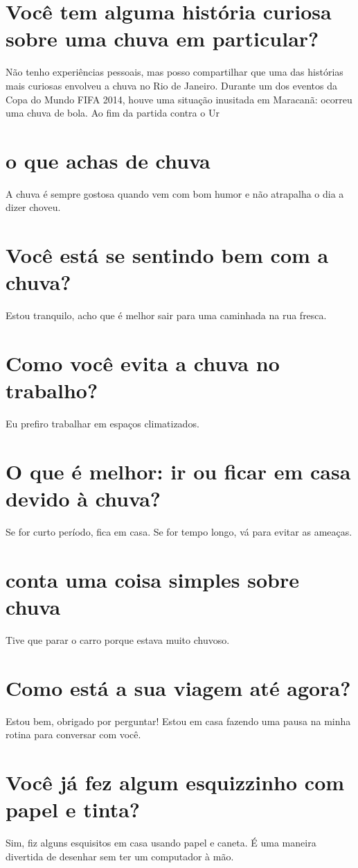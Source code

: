 \documentclass[11pt,a4paper]{article}
\begin{document}
\section{Você tem alguma história curiosa sobre uma chuva em particular?}
Não tenho experiências pessoais, mas posso compartilhar que uma das histórias mais curiosas envolveu a chuva no Rio de Janeiro. Durante um dos eventos da Copa do Mundo FIFA 2014, houve uma situação inusitada em Maracanã: ocorreu uma chuva de bola. Ao fim da partida contra o Ur

\section{o que achas de chuva}
A chuva é sempre gostosa quando vem com bom humor e não atrapalha o dia a dizer choveu.

\section{Você está se sentindo bem com a chuva?}
Estou tranquilo, acho que é melhor sair para uma caminhada na rua fresca.

\section{Como você evita a chuva no trabalho?}
Eu prefiro trabalhar em espaços climatizados.

\section{O que é melhor: ir ou ficar em casa devido à chuva?}
Se for curto período, fica em casa. Se for tempo longo, vá para evitar as ameaças.

\section{conta uma coisa simples sobre chuva}
Tive que parar o carro porque estava muito chuvoso.

\section{Como está a sua viagem até agora?}
Estou bem, obrigado por perguntar! Estou em casa fazendo uma pausa na minha rotina para conversar com você.

\section{Você já fez algum esquizzinho com papel e tinta?}
Sim, fiz alguns esquisitos em casa usando papel e caneta. É uma maneira divertida de desenhar sem ter um computador à mão.
\end{document}
